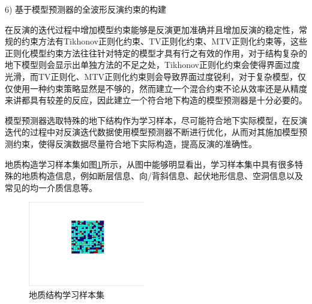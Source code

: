 \documentclass[11pt]{article}
\begin{document}
\par
6) 基于模型预测器的全波形反演约束的构建
\par
在反演的迭代过程中增加模型约束能够是反演更加准确并且增加反演的稳定性，常规的约束方法有Tikhonov正则化约束、TV正则化约束、MTV正则化约束等，这些正则化模型约束方法往往针对特定的模型才具有行之有效的作用，对于结构复杂的地下模型则会显示出单独方法的不足之处，Tikhonov正则化约束会使得界面过度光滑，而TV正则化、MTV正则化约束则会导致界面过度锐利，对于复杂模型，仅仅使用一种约束策略显然是不够的，然而建立一个混合约束不论从效率还是从精度来讲都具有较差的反应，因此建立一个符合地下构造的模型预测器是十分必要的。
\par
模型预测器选取特殊的地下结构作为学习样本，尽可能符合地下实际模型，在反演迭代的过程中对反演迭代数据使用模型预测器不断进行优化，从而对其施加模型预测约束，使得反演数据尽量符合地下实际构造，提高反演的准确性。
\par
地质构造学习样本集如图\ref{Fig_Model}所示，从图中能够明显看出，学习样本集中具有很多特殊的地质构造信息，例如断层信息、向/背斜信息、起伏地形信息、空洞信息以及常见的均一介质信息等。
\begin{figure}[htbp]
\centering
\includegraphics[width=2in]{./FigureFolder/Predict/Model.pdf}
\caption{地质结构学习样本集}
\label{Fig_Model}
\end{figure}
\par
\end{document}
